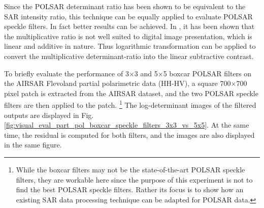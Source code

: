 \documentclass[journal]{IEEEtran}
\begin{document}
Since the POLSAR determinant ratio has been shown to be equivalent to the SAR intensity ratio,
  this technique can be equally applied to evaluate POLSAR speckle filters.
In fact better results can be achieved.
In \cite{Medeiros_2003_IJRS}, it has been shown that the multiplicative ratio is not  well suited to digital image presentation,
  which is linear and additive in nature.
Thus logarithmic transformation can be applied to convert the multiplicative determinant-ratio into the linear subtractive contrast.  

To briefly evaluate the performance of 3$\times$3 and 5$\times$5 boxcar POLSAR filters on the AIRSAR Flevoland partial polarimetric data (HH-HV),
  a square 700$\times$700 pixel patch is extracted from the AIRSAR dataset,
  and the two POLSAR speckle filters are then applied to the patch. 
 \footnote{While the boxcar filters may not be the state-of-the-art POLSAR speckle filters, they are workable here since the purpose of this experiment is not to find the best POLSAR speckle filters. Rather its focus is to show how an existing SAR data processing technique can be adapted for POLSAR data.} 
The log-determinant images of the filtered outputs are displayed in Fig. \ref{fig:visual_eval_part_pol_boxcar_speckle_filters_3x3_vs_5x5}.
At the same time, the residual is computed for both filters, and the images are also displayed in the same figure.
\end{document}
